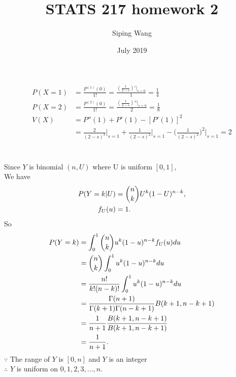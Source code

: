 \documentclass{article}
\title{STATS 217 homework 2}
\author{Siping Wang}
\date{July 2019}
\begin{document}
\maketitle

\section{}
\begin{align*}
    P(X = 1) &= \frac{P^{(1)}(0)}{1!} = \frac{(\frac{1}{2-s})'\big|_{s=0}}{1} = \frac{1}{4} \\
    P(X = 2) &= \frac{P^{(2)}(0)}{1!} = \frac{(\frac{1}{2-s})''\big|_{s=0}}{2} = \frac{1}{8} \\
    V(X) &= P''(1) + P'(1) - [P'(1)]^2 \\
    &= \frac{2}{(2-s)^3} \bigg|_{s=1} + \frac{1}{(2-s)^2} \bigg|_{s=1} - \Big(\frac{1}{(2-s)^2}\Big)^2\bigg|_{s=1} = 2
\end{align*}

\section{}
Since  $Y$ is binomial $(n, U )$ where U is uniform $[0, 1]$, \\
We have
\begin{align*}
    P(Y = k| U) &= \dbinom{n}{k} U^k (1-U)^{n - k}, \\
    f_U(u) &= 1. 
\end{align*}
So
\begin{align*}
    P(Y = k) &= \int_0^1 \dbinom{n}{k} u^k (1-u)^{n-k} f_U(u) du \\
    &= \dbinom{n}{k} \int_0^1 u^k (1-u)^{n-k} du \\
    &= \frac{n!}{k!(n-k)!} \int_0^1 u^k (1-u)^{n-k} du \\
    &= \frac{\Gamma (n+1)}{\Gamma (k+1) \Gamma (n-k+1)} B(k+1, n-k+1) \\
    &= \frac{1}{n+1} \frac{B(k+1, n-k+1)}{B(k+1, n-k+1)} \\
    &= \frac{1}{n+1} .
\end{align*}
$\because$ The range of $Y$ is $[0, n]$ and $Y$ is an integer \\
$\therefore$ $Y$ is uniform on ${0, 1, 2, 3, ..., n}$.
\end{document}
